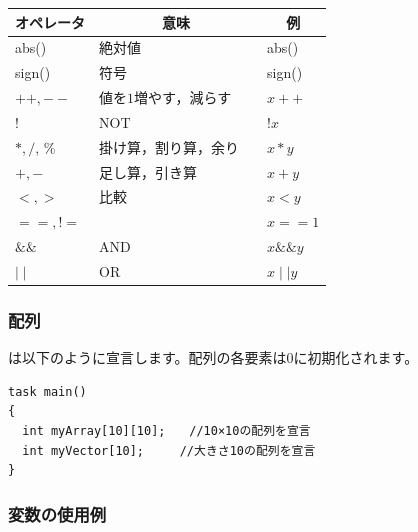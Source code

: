\documentclass[11pt]{jarticle}
\makeatletter
\def\nmindex{\@ifnextchar[{\@nmindex}{\@@nmindex}}
\def\@nmindex[#1]#2{#2\index{#1@#2}}
\def\@@nmindex#1{#1\index{#1}}
\makeatother
\begin{document}
\begin{center}
\begin{tabular}{lll}  \\ \hline
\multicolumn{1}{c}{オペレータ} & \multicolumn{1}{c}{意味} & \multicolumn{1}{c}{例}  \\ \hline\hline
abs() & 絶対値  & abs()    \\  
sign()  & 符号 & sign()  \\ \hline
$++,--$  & 値を$1$増やす，減らす & $x++$  \\ \hline
$!$              & NOT &  $!x$  \\ \hline 
$*,/$, \% & 掛け算，割り算，余り　& $x*y$  \\ \hline
$+,-$    & 足し算，引き算　      &   $x+y$   \\ \hline
$<, >$   & 比較                                      &   $x<y$  \\
$==,!=$ &                               &  $x==1$  \\ \hline
$\&\&$       & AND                             & $x\&\&y$  \\ \hline
$\mid\mid$  & OR                             & $x\mid\mid y$  \\ \hline

\end{tabular}
\end{center}


\subsubsection{配列}

\nmindex[はいれつ]{配列}は以下のように宣言します。配列の各要素は$0$に初期化されます。

\begin{screen}{\small
\begin{verbatim}
task main() 
{ 
  int myArray[10][10];　　//10×10の配列を宣言 
  int myVector[10];　　　//大きさ10の配列を宣言
} 
\end{verbatim}}
\end{screen}


\subsubsection{変数の使用例}
\end{document}
